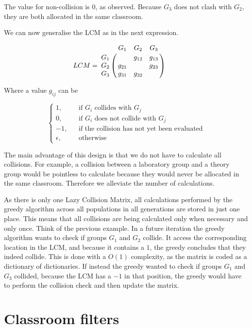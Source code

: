 The value for non-collision is $0$, as observed. Because $G_{3}$ does not clash with $G_{2}$, they are both allocated in the same classroom.

We can now generalise the LCM as in the next expression.

\begin{equation}
    LCM = \bordermatrix{
        & G_{1} & G_{2} & G_{3} \cr
        G_{1} &  & g_{12} & g_{13} \cr
        G_{2} & g_{21} &  & g_{23} \cr
        G_{3} & g_{31} & g_{32} & 
    } \qquad
\end{equation}

Where a value $g_{ij}$ can be

\[
    \begin{cases}
        1\text{,} &\quad\text{if $G_{i}$ collides with $G_{j}$}\\
        0\text{,} &\quad\text{if $G_{i}$ does not collide with $G_{j}$}\\
        -1\text{,} &\quad\text{if the collision has not yet been evaluated}\\
        \epsilon\text{,} &\quad\text{otherwise}
    \end{cases}
\]

The main advantage of this design is that we do not have to calculate all collisions. For example, a collision between a laboratory group and a theory group would be pointless to calculate because they would never be allocated in the same classroom. Therefore we alleviate the number of calculations. 

As there is only one Lazy Collision Matrix, all calculations performed by the greedy algorithm across all populations in all generations are stored in just one place. This means that all collisions are being calculated only when necessary and only once. Think of the previous example. In a future iteration the greedy algorithm wants to check if groups $G_{1}$ and $G_{2}$ collide. It access the corresponding location in the LCM, and because it contains a $1$, the greedy concludes that they indeed collide. This is done with a $O(1)$ complexity, as the matrix is coded as a dictionary of dictionaries. If instead the greedy wanted to check if groups $G_{1}$ and $G_{3}$ collided, because the LCM has a $-1$ in that position, the greedy would have to perform the collision check and then update the matrix.



\section{Classroom filters}\label{classroom-filters}

